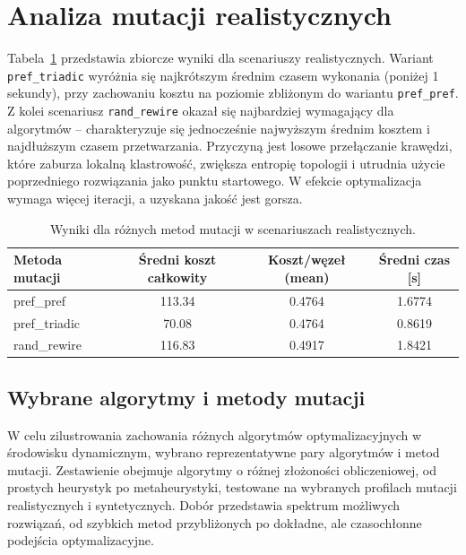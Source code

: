 \section{Analiza mutacji realistycznych}
Tabela~\ref{tab:dyn-real-warm} przedstawia zbiorcze wyniki dla scenariuszy realistycznych. Wariant \texttt{pref\_triadic} wyróżnia się najkrótszym średnim czasem wykonania (poniżej 1 sekundy), przy zachowaniu kosztu na poziomie zbliżonym do wariantu \texttt{pref\_pref}. Z kolei scenariusz \texttt{rand\_rewire} okazał się najbardziej wymagający dla algorytmów -- charakteryzuje się jednocześnie najwyższym średnim kosztem i najdłuższym czasem przetwarzania. Przyczyną jest losowe przełączanie krawędzi, które zaburza lokalną klastrowość, zwiększa entropię topologii i utrudnia użycie poprzedniego rozwiązania jako punktu startowego. W efekcie optymalizacja wymaga więcej iteracji, a uzyskana jakość jest gorsza.


\begin{table}[H]
    \centering
    \caption{Wyniki dla różnych metod mutacji w scenariuszach realistycznych.}
    \label{tab:dyn-real-warm}
    \begin{tabular}{lccc}
        \toprule
        \textbf{Metoda mutacji} & \textbf{Średni koszt całkowity} & \textbf{Koszt/węzeł (mean)} & \textbf{Średni czas [s]} \\
        \midrule
        pref\_pref              & 113.34                          & 0.4764                      & 1.6774                   \\
        pref\_triadic           & 70.08                           & 0.4764                      & 0.8619                   \\
        rand\_rewire            & 116.83                          & 0.4917                      & 1.8421                   \\
        \bottomrule
    \end{tabular}
\end{table}

\subsection{Wybrane algorytmy i metody mutacji}
W celu zilustrowania zachowania różnych algorytmów optymalizacyjnych w środowisku dynamicznym, wybrano reprezentatywne pary algorytmów i metod mutacji. Zestawienie obejmuje algorytmy o różnej złożoności obliczeniowej, od prostych heurystyk po metaheurystyki, testowane na wybranych profilach mutacji realistycznych i syntetycznych. Dobór przedstawia spektrum możliwych rozwiązań, od szybkich metod przybliżonych po dokładne, ale czasochłonne podejścia optymalizacyjne.

